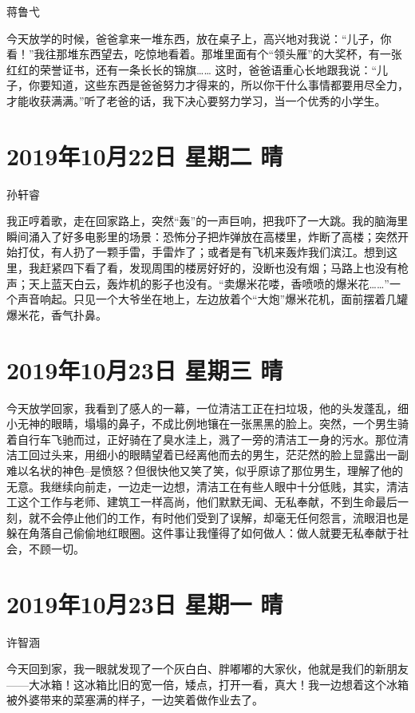 蒋鲁弋

今天放学的时候，爸爸拿来一堆东西，放在桌子上，高兴地对我说：“儿子，你看！”我往那堆东西望去，吃惊地看着。那堆里面有个“领头雁”的大奖杯，有一张红红的荣誉证书，还有一条长长的锦旗…… 这时，爸爸语重心长地跟我说：“儿子，你要知道，这些东西是爸爸努力才得来的，所以你干什么事情都要用尽全力，才能收获满满。”听了老爸的话，我下决心要努力学习，当一个优秀的小学生。

\section{2019年10月22日 星期二 晴}

孙轩睿

我正哼着歌，走在回家路上，突然“轰”的一声巨响，把我吓了一大跳。我的脑海里瞬间涌入了好多电影里的场景：恐怖分子把炸弹放在高楼里，炸断了高楼；突然开始打仗，有人扔了一颗手雷，手雷炸了；或者是有飞机来轰炸我们滨江。想到这里，我赶紧四下看了看，发现周围的楼房好好的，没断也没有烟；马路上也没有枪声；天上蓝天白云，轰炸机的影子也没有。“卖爆米花喽，香喷喷的爆米花……”一个声音响起。只见一个大爷坐在地上，左边放着个“大炮”爆米花机，面前摆着几罐爆米花，香气扑鼻。

\section{2019年10月23日 星期三 晴}

今天放学回家，我看到了感人的一幕，一位清洁工正在扫垃圾，他的头发蓬乱，细小无神的眼睛，塌塌的鼻子，不成比例地镶在一张黑黑的脸上。突然，一个男生骑着自行车飞驰而过，正好骑在了臭水洼上，溅了一旁的清洁工一身的污水。那位清洁工回过头来，用细小的眼睛望着已经离他而去的男生，茫茫然的脸上显露出一副难以名状的神色--是愤怒？但很快他又笑了笑，似乎原谅了那位男生，理解了他的无意。我继续向前走，一边走一边想，清洁工在有些人眼中十分低贱，其实，清洁工这个工作与老师、建筑工一样高尚，他们默默无闻、无私奉献，不到生命最后一刻，就不会停止他们的工作，有时他们受到了误解，却毫无任何怨言，流眼泪也是躲在角落自己偷偷地红眼圈。这件事让我懂得了如何做人：做人就要无私奉献于社会，不顾一切。

\section{2019年10月23日 星期一 晴}

许智涵

今天回到家，我一眼就发现了一个灰白白、胖嘟嘟的大家伙，他就是我们的新朋友——大冰箱！这冰箱比旧的宽一倍，矮点，打开一看，真大！我一边想着这个冰箱被外婆带来的菜塞满的样子，一边笑着做作业去了。

